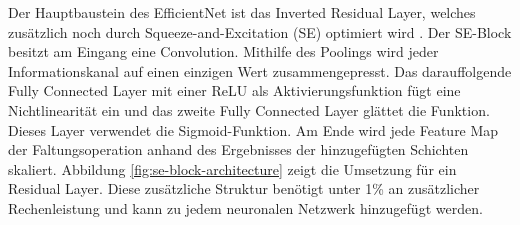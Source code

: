 \mypar Der Hauptbaustein des EfficientNet ist das Inverted Residual Layer, welches zusätzlich noch durch Squeeze-and-Excitation (SE) optimiert wird \cite{efficientnet}. Der SE-Block besitzt am Eingang eine Convolution. Mithilfe des Poolings wird jeder Informationskanal auf einen einzigen Wert zusammengepresst. Das darauffolgende Fully Connected Layer mit einer ReLU als Aktivierungsfunktion fügt eine Nichtlinearität ein und das zweite Fully Connected Layer glättet die Funktion. Dieses Layer verwendet die Sigmoid-Funktion. Am Ende wird jede Feature Map der Faltungsoperation anhand des Ergebnisses der hinzugefügten Schichten skaliert. Abbildung \ref{fig:se-block-architecture} zeigt die Umsetzung für ein Residual Layer. Diese zusätzliche Struktur benötigt unter 1{\%} an zusätzlicher Rechenleistung und kann zu jedem neuronalen Netzwerk hinzugefügt werden. \cite{squeeze-and-excitation-networks}














